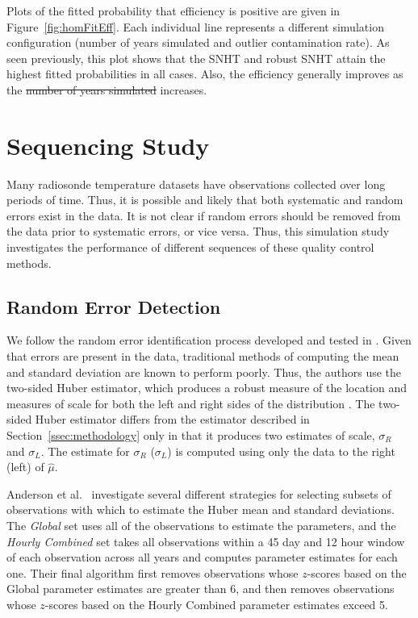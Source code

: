 \documentclass[12pt]{article}
\providecommand{\DIFaddtex}[1]{{\protect\color{blue}\uwave{#1}}} %
\providecommand{\DIFdeltex}[1]{{\protect\color{red}\sout{#1}}}                      %
\providecommand{\DIFaddbegin}{} %
\providecommand{\DIFaddend}{} %
\providecommand{\DIFdelbegin}{} %
\providecommand{\DIFdelend}{} %
\providecommand{\DIFadd}[1]{\texorpdfstring{\DIFaddtex{#1}}{#1}} %
\providecommand{\DIFdel}[1]{\texorpdfstring{\DIFdeltex{#1}}{}} %
\begin{document}
\begin{doublespacing}
Plots of the fitted probability that efficiency is positive are given in Figure~\ref{fig:homFitEff}.  Each individual line represents a different simulation configuration (number of years simulated and outlier contamination rate).  As seen previously, this plot shows that the SNHT and robust SNHT attain the highest fitted probabilities in all cases.  Also, the efficiency generally improves as the \DIFdelbegin \DIFdel{number of years simulated }\DIFdelend \DIFaddbegin \DIFadd{sample size }\DIFaddend increases.

\section{Sequencing Study}

Many radiosonde temperature datasets have observations collected over long periods of time.  Thus, it is possible and likely that both systematic and random errors exist in the data.  It is not clear if random errors should be removed from the data prior to systematic errors, or vice versa.  Thus, this simulation study investigates the performance of different sequences of these quality control methods.

\subsection{Random Error Detection}
\label{sec:ranErr}
We follow the random error identification process developed and tested in \cite{bell14}.  Given that errors are present in the data, traditional methods of computing the mean and standard deviation are known to perform poorly.  Thus, the authors use the two-sided Huber estimator, which produces a robust measure of the location and \DIFaddbegin \DIFadd{robust }\DIFaddend measures of scale for both the left and right sides of the distribution \cite{huber11}.  The two-sided Huber estimator differs from the estimator described in Section~\ref{ssec:methodology} only in that it produces two estimates of scale, $\sigma_R$ and $\sigma_L$.  The estimate for $\sigma_R$ ($\sigma_L$) is computed using only the data to the right (left) of $\hat{\mu}$.

Anderson et al.~\cite{bell14} investigate several different strategies for selecting subsets of observations with which to estimate the Huber mean and standard deviations.  The \emph{Global} set uses all of the observations to estimate the parameters, and the \emph{Hourly Combined} set takes all observations within  a 45 day and 12 hour window of each observation across all years and computes parameter estimates for each one.  Their final algorithm first removes observations whose $z$-scores based on the Global parameter estimates are greater than 6, and then removes observations whose $z$-scores  based on the Hourly Combined parameter estimates exceed 5.  


\end{doublespacing}
\end{document}
